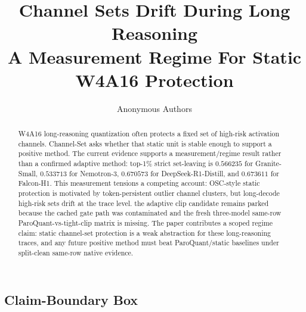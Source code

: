 \documentclass{article}
\title{Channel Sets Drift During Long Reasoning\\\large A Measurement Regime For Static W4A16 Protection}
\author{Anonymous Authors}
\begin{document}
\ifcolmsubmission
\linenumbers
\fi
\maketitle

\begin{abstract}
W4A16 long-reasoning quantization often protects a fixed set of
high-risk activation channels. Channel-Set asks whether that static unit
is stable enough to support a positive method. The current evidence
supports a measurement/regime result rather than a confirmed adaptive
method: top-1\% strict set-leaving is \(0.566235\) for
Granite-Small, \(0.533713\) for Nemotron-3, \(0.670573\) for
DeepSeek-R1-Distill, and \(0.673611\) for Falcon-H1. This
measurement tensions a competing account: OSC-style static protection is
motivated by token-persistent outlier channel clusters, but long-decode
high-risk sets drift at the trace level. the adaptive clip candidate
remains parked because the cached gate path was contaminated and the
fresh three-model same-row ParoQuant-vs-tight-clip matrix is missing.
The paper contributes a scoped regime claim: static channel-set
protection is a weak abstraction for these long-reasoning traces, and
any future positive method must beat ParoQuant/static baselines under
split-clean same-row native evidence.
\end{abstract}

\hypertarget{claim-boundary-box}{%
\subsection{Claim-Boundary Box}\label{claim-boundary-box}}
\end{document}
